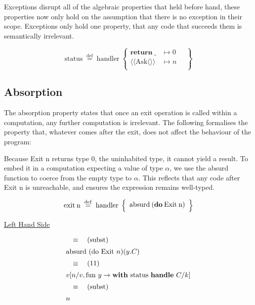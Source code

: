 \documentclass[logo,bsc,singlespacing,parskip]{infthesis}
\begin{document}
Exceptions disrupt all of the algebraic properties that held before hand, these properties now only hold on the assumption that there is no exception in their scope. Exceptions only hold one property, that any code that succeeds them is semantically irrelevant.



\[
\mathrm{status} \;\overset{\mathrm{def}}{=}\;
\mathrm{handler} \;\left\{
\begin{array}{ll}
  \mathrm{\textbf{return}\:\_} & \mapsto 0 \quad\\[0.5ex]
  \langle\!\langle \mathrm{Ask} \langle\rangle\rangle &  \mapsto n \quad\\[0.5ex]
 
\end{array}
\right\}
\]







\subsection*{Absorption}

The absorption property states that once an exit operation is called within a computation, any further computation is irrelevant. The following formalises the property that, whatever comes after the exit, does not affect the behaviour of the program:


Because Exit n returns type 0, the uninhabited type, it cannot yield a result. To embed it in a computation expecting a value of type $\alpha$, we use the absurd function to coerce from the empty type to $\alpha$. This reflects that any code after Exit n is unreachable, and ensures the expression remains well-typed.






\[
\mathrm{exit\:n} \;\overset{\mathrm{def}}{=}\;
\mathrm{handler} \;\left\{
\begin{array}{l}
  \text{absurd\:(\textbf{do}\:Exit\:n)} \quad\\[0.5ex]

\end{array}
\right\}
\]



\underline{Left Hand Side}

\[
\begin{array}{l}
\quad\equiv\quad (\text{subst}) \\[5pt]
\text{absurd (do Exit } n) (y. C) \\[5pt]
\quad\equiv\quad (11) \\[5pt]
v [n/v, \text{fun } y \rightarrow \text{\textbf{with} status \textbf{handle} } C/k] \\[5pt]
\quad\equiv\quad (\text{subst}) \\[5pt]
n
\end{array}
\]
\end{document}
